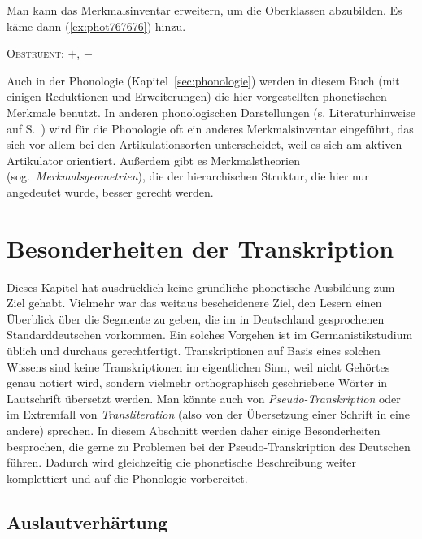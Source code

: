 Man kann das Merkmalsinventar erweitern, um die Oberklassen abzubilden.
Es käme dann (\ref{ex:phot767676}) hinzu.

\begin{exe}
		\begin{xlist}
			\ex \textsc{Obstruent}: $+$, $-$
		\end{xlist}
\end{exe}

Auch in der Phonologie (Kapitel~\ref{sec:phonologie}) werden in diesem Buch (mit einigen Reduktionen und Erweiterungen) die hier vorgestellten phonetischen Merkmale benutzt.
In anderen phonologischen Darstellungen (s. Literaturhinweise auf S.~\pageref{abs:pholliteratur}) wird für die Phonologie oft ein anderes Merkmalsinventar eingeführt, das sich vor allem bei den Artikulationsorten unterscheidet, weil es sich am aktiven Artikulator orientiert.
Außerdem gibt es Merkmalstheorien (sog.\ \textit{Merkmalsgeometrien}), die der hierarchischen Struktur, die hier nur angedeutet wurde, besser gerecht werden.

\section{Besonderheiten der Transkription}

\label{sec:besonderheitendertranskription}

Dieses Kapitel hat ausdrücklich keine gründliche phonetische Ausbildung zum Ziel gehabt.
Vielmehr war das weitaus bescheidenere Ziel, den Lesern einen Überblick über die Segmente zu geben, die im in Deutschland gesprochenen Standarddeutschen vorkommen.
Ein solches Vorgehen ist im Germanistikstudium üblich und durchaus gerechtfertigt. 
Transkriptionen auf Basis eines solchen Wissens sind keine Transkriptionen im eigentlichen Sinn, weil nicht Gehörtes genau notiert wird, sondern vielmehr orthographisch geschriebene Wörter in Lautschrift übersetzt werden.
Man könnte auch von \textit{Pseudo-Transkription} oder im Extremfall von \textit{Transliteration} (also von der Übersetzung einer Schrift in eine andere) sprechen.
In diesem Abschnitt werden daher einige Besonderheiten besprochen, die gerne zu Problemen bei der Pseudo-Transkription des Deutschen führen.
Dadurch wird gleichzeitig die phonetische Beschreibung weiter komplettiert und auf die Phonologie vorbereitet.

\subsection{Auslautverhärtung}

